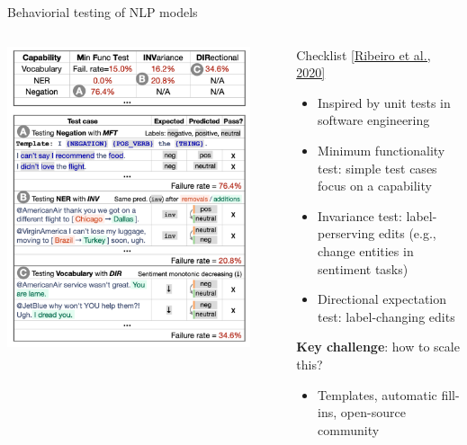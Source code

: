 \documentclass[usenames,dvipsnames,notes,11pt,aspectratio=169,hyperref={colorlinks=true, linkcolor=blue}]{beamer}
\begin{document}
\begin{frame}
    {Behaviorial testing of NLP models}
    \begin{columns}
        \begin{column}{0.45\textwidth}
            \includegraphics[width=0.9\textwidth]{figures/checklist}
        \end{column}
        \begin{column}{0.55\textwidth}
            Checklist \href{https://arxiv.org/pdf/2005.04118.pdf}{[Ribeiro et al., 2020]}
            \begin{itemize}
                \item Inspired by unit tests in software engineering  
                \item Minimum functionality test: simple test cases focus on a capability
                \item Invariance test: label-perserving edits (e.g., change entities in sentiment tasks)
                \item Directional expectation test: label-changing edits
            \end{itemize}
            \pause
            \textbf{Key challenge}: how to scale this?\\
            \begin{itemize}
                \item Templates, automatic fill-ins, open-source community 
            \end{itemize}
        \end{column}
    \end{columns}
\end{frame}
\end{document}
